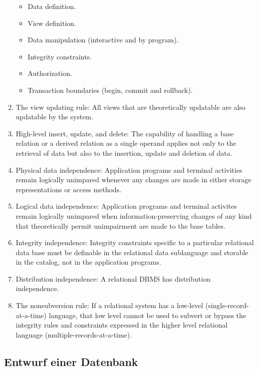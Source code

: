 \begin{enumerate}
	\begin{itemize}
	\itemsep0em
      	\item Data definition.
		\item View definition.
		\item Data manipulation (interactive and by program).
		\item Integrity constraints.
		\item Authorization.
		\item Transaction boundaries (begin, commit and rollback).
	\end{itemize}
	\item The view updating rule: All views that are theoretically updatable are also updatable by the system.
	\item High-level insert, update, and delete: The capability of handling a base relation or a derived relation as a single operand applies not only to the retrieval of data but also to the insertion, update and deletion of data.
	\item Physical data independence: Application programs and terminal activities remain logically unimpared whenever any changes are made in either storage representations or access methods.
	\item Logical data independence: Application programs and terminal activites remain logically unimpared when information-preserving changes of any kind that theoretically permit unimpairment are made to the base tables.
	\item Integrity independence: Integrity constraints specific to a particular relational data base must be definable in the relational data sublanguage and storable in the catalog, not in the application programs.
	\item Distribution independence: A relational DBMS has distribution independence.
	\item The nonsubversion rule: If a relational system has a low-level (single-record-at-a-time) language, that low level cannot be used to subvert or bypass the integrity rules and constraints expressed in the higher level relational language (multiple-records-at-a-time).
\end{enumerate}

\newpage
\subsection{Entwurf einer Datenbank}

